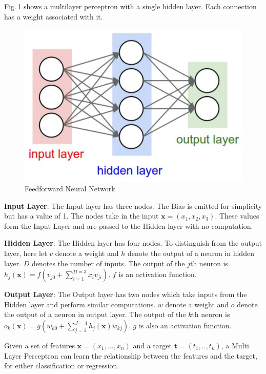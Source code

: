 Fig.\,\ref{one_layer} shows a multilayer perceptron with a single hidden layer. Each connection has a weight associated with it.

\begin{figure}[h]
	\centering
	\includegraphics[scale=0.5]{Figs/1hidden.png}
    \caption{Feedforward Neural Network}
    \label{one_layer}
\end{figure}


\textbf{Input Layer}: The Input layer has three nodes. The Bias is emitted for simplicity but has a value of 1. The nodes take in the input $\mathbf{x} = (x_1,x_2,x_3)$. These values form the Input Layer and are passed to the Hidden layer with no computation.

\textbf{Hidden Layer}: The Hidden layer has four nodes. To distinguish from the output layer, here let $v$ denote a weight and $h$ denote the output of a neuron in hidden layer. $D$ denotes the number of inputs. The output of the $j$th neuron is $h_j(\mathbf{x}) = f(v_{j0}+\sum_{i=1}^{D=3} x_iv_{ji})$. $f$ is an activation function.

\textbf{Output Layer}: The Output layer has two nodes which take inputs from the Hidden layer and perform similar computations.
$w$ denote a weight and $o$ denote the output of a neuron in output layer. The output of the $k$th neuron is $o_k(\mathbf{x}) = g(w_{k0}+\sum_{j=1}^{J=4} h_j(\mathbf{x}) w_{kj})$. $g$ is also an activation function.

Given a set of features $\mathbf{x} = (x_1,...,x_n)$ and a target $\mathbf{t} = (t_1,..,t_n)$, a Multi Layer Perceptron can learn the relationship between the features and the target, for either classification or regression.


